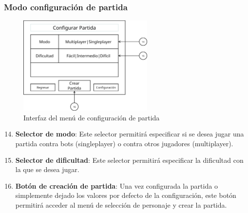 \subsubsection{Modo configuración de partida}
\begin{figure}[H]
    \centering
    \includegraphics[width=0.6\textwidth]{5-Cuerpo/Chapter5/I4.png} %
    \caption{Interfaz del menú de configuración de partida}
    \label{fig:Interface_Configuracion_Partida}
\end{figure}
\begin{enumerate}\setcounter{enumi}{13}
    \item \textbf{Selector de modo}: Este selector permitirá especificar si se
    desea jugar una partida contra bots (singleplayer) o contra otros jugadores
    (multiplayer).
    \item \textbf{Selector de dificultad}: Este selector permitirá especificar
    la dificultad con la que se desea jugar.
    \item \textbf{Botón de creación de partida}: Una vez configurada la partida
    o simplemente dejado los valores por defecto de la configuración, este botón
    permitirá acceder al menú de selección de personaje y crear la partida.
\end{enumerate}

